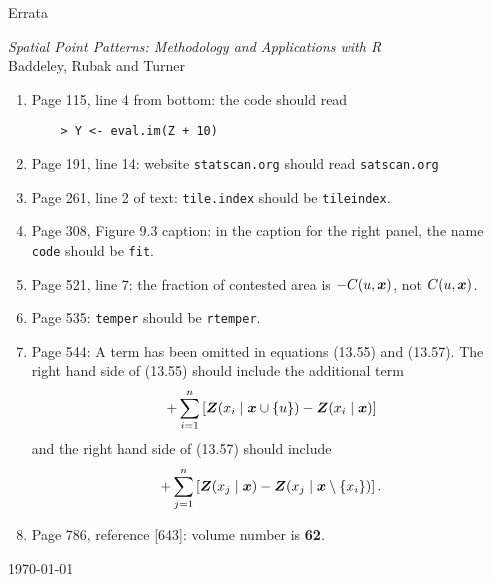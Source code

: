 \documentclass[12pt,a4paper]{article}
\newcommand{\boldmaths}[1]{{\ensuremath\boldsymbol{#1}}}
\newcommand{\bx}{\boldmaths x}
\newcommand{\bZ}{\boldmaths Z}
\begin{document}
\thispagestyle{empty}
\begin{center}
  \begin{LARGE}
    Errata 
  \end{LARGE}

  \begin{large}
    \emph{Spatial Point Patterns: Methodology and Applications with R}\\
    Baddeley, Rubak and Turner
  \end{large}
\end{center}

\begin{enumerate}
\item Page 115, line 4 from bottom: the code should read
\begin{verbatim}
    > Y <- eval.im(Z + 10)
\end{verbatim}
\item Page 191, line 14: 
 website \texttt{statscan.org} should read \texttt{satscan.org}
\item Page 261, line 2 of text: 
\texttt{tile.index} should be \texttt{tileindex}.
\item Page 308, Figure 9.3 caption: in the caption for the right panel,
the name \texttt{code} should be \texttt{fit}.
\item Page 521, line 7: the fraction of contested area is $-C(u, \bx)$,
not $C(u,\bx)$.
\item Page 535: \texttt{temper} should be \texttt{rtemper}.
\item Page 544: A term has been omitted in equations (13.55) and (13.57).
The right hand side of (13.55) should include the additional term
\[
   + \sum_{i=1}^n \left[ \bZ(x_i \mid \bx \cup \{u\}) - \bZ(x_i \mid \bx) \right]
\]
and the right hand side of (13.57) should include
\[
  + \sum_{j=1}^n \left[ \bZ(x_j \mid \bx) - \bZ(x_j \mid \bx \setminus \{x_i\}) \right].
\]
\item Page 786, reference [643]: volume number is \textbf{62}.
\end{enumerate}

\vspace*{\fill}

\hspace*{\fill} \today
\end{document}
